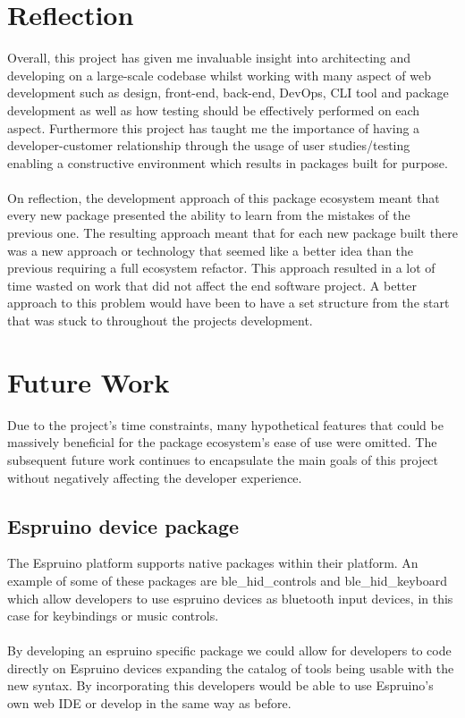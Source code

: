 \documentclass{l4proj}
\begin{document}
\section{Reflection}

Overall, this project has given me invaluable insight into architecting and developing on a large-scale codebase whilst working with many aspect of web development such as design, front-end, back-end, DevOps, CLI tool and package development as well as how testing should be effectively performed on each aspect. Furthermore this project has taught me the importance of having a developer-customer relationship through the usage of user studies/testing enabling a constructive environment which results in packages built for purpose.
\\ \\
On reflection, the development approach of this package ecosystem meant that every new package presented the ability to learn from the mistakes of the previous one. The resulting approach meant that for each new package built there was a new approach or technology that seemed like a better idea than the previous requiring a full ecosystem refactor. This approach resulted in a lot of time wasted on work that did not affect the end software project. A better approach to this problem would have been to have a set structure from the start that was stuck to throughout the projects development.

\section{Future Work}
Due to the project's time constraints, many hypothetical features that could be massively beneficial for the package ecosystem's ease of use were omitted. The subsequent future work continues to encapsulate the main goals of this project without negatively affecting the developer experience.
\subsection{Espruino device package}

The Espruino platform supports native packages within their platform. An example of some of these packages are ble\_hid\_controls and ble\_hid\_keyboard which allow developers to use espruino devices as bluetooth input devices, in this case for keybindings or music controls.
\\ \\
By developing an espruino specific package we could allow for developers to code directly on Espruino devices expanding the catalog of tools being usable with the new syntax. By incorporating this developers would be able to use Espruino's own web IDE or develop in the same way as before.
\end{document}
